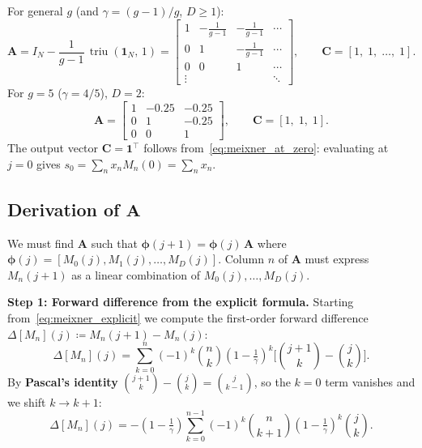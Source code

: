 \documentclass[11pt, a4paper]{article}
\theoremstyle{definition}
\newcommand{\vC}{\bm{C}}
\newcommand{\mA}{\bm{A}}
\newcommand{\mphi}{\bm{\phi}}
\newcommand{\defeq}{\coloneqq}
\newcommand{\triu}{\operatorname{triu}}
\begin{document}
For general $g$ (and $\gamma = (g-1)/g$, $D \geq 1$):
\begin{equation}
  \mA = I_N - \frac{1}{g-1}\,\triu(\mathbf{1}_N,\, 1)
  =
  \begin{bmatrix}
    1 & -\tfrac{1}{g-1} & -\tfrac{1}{g-1} & \cdots \\
    0 & 1               & -\tfrac{1}{g-1} & \cdots \\
    0 & 0               & 1               & \cdots \\
    \vdots & & & \ddots
  \end{bmatrix},
  \qquad
  \vC = [1,\; 1,\; \ldots,\; 1].
  \label{eq:meixner_A}
\end{equation}
For $g=5$ ($\gamma=4/5$), $D=2$:
\begin{equation}
  \mA = \begin{bmatrix}
    1 & -0.25 & -0.25 \\
    0 & 1     & -0.25 \\
    0 & 0     & 1
  \end{bmatrix}, \qquad \vC = [1,\; 1,\; 1].
\end{equation}
The output vector $\vC = \mathbf{1}^\top$ follows from~\eqref{eq:meixner_at_zero}:
evaluating at $j=0$ gives $s_0 = \sum_n x_n M_n(0) = \sum_n x_n$.

\subsection{Derivation of \texorpdfstring{$\mA$}{A}}

We must find $\mA$ such that
$\mphi(j+1) = \mphi(j)\,\mA$ where $\mphi(j) = [M_0(j), M_1(j), \ldots, M_D(j)]$.
Column $n$ of $\mA$ must express $M_n(j+1)$ as a linear combination of
$M_0(j), \ldots, M_D(j)$.

\medskip
\noindent\textbf{Step 1: Forward difference from the explicit formula.}
Starting from~\eqref{eq:meixner_explicit} we compute the first-order
forward difference $\Delta[M_n](j) \defeq M_n(j+1) - M_n(j)$:
\[
  \Delta[M_n](j)
  = \sum_{k=0}^{n} (-1)^k\binom{n}{k}\!\left(1-\tfrac{1}{\gamma}\right)^k
    \!\bigl[\binom{j+1}{k} - \binom{j}{k}\bigr].
\]
By \textbf{Pascal's identity} $\binom{j+1}{k} - \binom{j}{k} = \binom{j}{k-1}$,
so the $k=0$ term vanishes and we shift $k \to k+1$:
\begin{equation}
  \Delta[M_n](j)
  = -\!\left(1-\tfrac{1}{\gamma}\right)\!
    \sum_{k=0}^{n-1} (-1)^k\binom{n}{k+1}\!\left(1-\tfrac{1}{\gamma}\right)^k
    \binom{j}{k}.
  \label{eq:diff1}
\end{equation}
\end{document}
